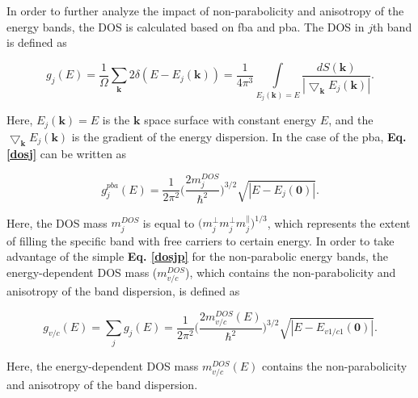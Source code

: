 \documentclass[a4paper, 12pt, titlepage,oneside,drop]{kthesis}
\begin{document}
In order to further analyze the impact of non-parabolicity and anisotropy of the energy bands, the DOS is calculated based on fba and pba. The DOS in $j$th band is defined as

\begin{equation}\label{dosj}
 g_j(E)=\frac{1}{\Omega} \sum\limits_{\textbf{k}} 2 \delta (E-E_j(\textbf{k})) = \frac{1}{4\pi^3} \int \limits_{E_j(\textbf{k}) = E} \frac{dS(\textbf{k})}{|\bigtriangledown_\textbf{k} E_j(\textbf{k})|}.
\end{equation}
 
Here, $E_j(\textbf{k}) = E$ is the $\textbf{k}$ space surface with constant energy $E$, and the $\bigtriangledown_\textbf{k} E_j(\textbf{k})$ is the gradient of the energy dispersion.
In the case of the pba, \textbf{Eq. \ref{dosj}} can be written as

\begin{equation}\label{dosjp}
 g_j^{pba}(E) = \frac{1}{2\pi^2} \big(\frac{2m_j^{DOS}}{\hbar^2}\big)^{3/2} \sqrt{|E-E_j(\textbf{0})|}.
\end{equation}
 
Here, the DOS mass $m_j^{DOS}$ is equal to $\big( m_j^{\perp}m_j^{\perp}m_j^{\parallel} \big)^{1/3}$, which represents the extent of filling the specific band with free carriers to certain energy. 
In order to take advantage of the simple \textbf{Eq. \ref{dosjp}} for the non-parabolic energy bands, the energy-dependent DOS mass ($m_{v/c}^{DOS}$), which contains the non-parabolicity and anisotropy of the band dispersion, 
is defined as

\begin{equation}\label{dosmass}
 g_{v/c}(E) = \sum\limits_j g_j(E) = \frac{1}{2\pi^2} \big(\frac{2m_{v/c}^{DOS}(E)}{\hbar^2}\big)^{3/2} \sqrt{|E-E_{v1/c1}(\textbf{0})|}.
\end{equation}

Here, the energy-dependent DOS mass $m_{v/c}^{DOS}(E)$ contains the non-parabolicity and anisotropy of the band dispersion.
\end{document}
